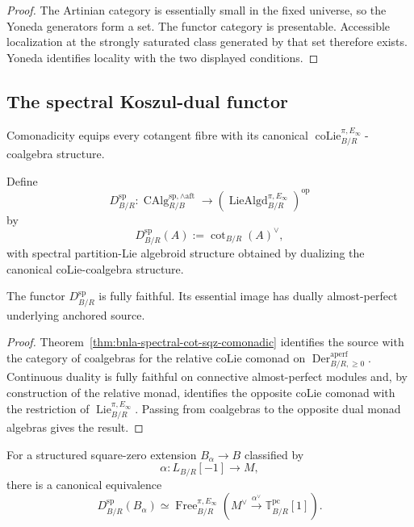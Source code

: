 \begin{proof}
The Artinian category is essentially small in the fixed universe, so the
Yoneda generators form a set.  The functor category is presentable.
Accessible localization at the strongly saturated class generated by that set
therefore exists.  Yoneda identifies locality with the two displayed
conditions.
\end{proof}

\subsection{The spectral Koszul-dual functor}

Comonadicity equips every cotangent fibre with its canonical
$\operatorname{coLie}^{\pi,E_\infty}_{B/R}$-coalgebra structure.

\begin{definition}
\label{def:bnla-spectral-D-functor}
Define
\[
    D^{\mathrm{sp}}_{B/R}:
    \operatorname{CAlg}^{\mathrm{sp},\wedge\mathrm{aft}}_{R/B}
    \longrightarrow
    \left(
        \operatorname{LieAlgd}^{\pi,E_\infty}_{B/R}
    \right)^{\mathrm{op}}
\]
by
\[
\boxed{
    D^{\mathrm{sp}}_{B/R}(A)
    :=
    \operatorname{cot}_{B/R}(A)^\vee,}
\]
with spectral partition-Lie algebroid structure obtained by dualizing the
canonical coLie-coalgebra structure.
\end{definition}

\begin{theorem}
\label{thm:bnla-spectral-D-fully-faithful}
The functor $D^{\mathrm{sp}}_{B/R}$ is fully faithful.  Its essential image has
dually almost-perfect underlying anchored source.
\end{theorem}

\begin{proof}
Theorem~\ref{thm:bnla-spectral-cot-sqz-comonadic} identifies the source with
the category of coalgebras for the relative coLie comonad on
$\operatorname{Der}^{\mathrm{aperf}}_{B/R,\geq0}$.  Continuous duality is fully
faithful on connective almost-perfect modules and, by construction of the
relative monad, identifies the opposite coLie comonad with the restriction of
$\operatorname{Lie}^{\pi,E_\infty}_{B/R}$.  Passing from coalgebras to the
opposite dual monad algebras gives the result.
\end{proof}

\begin{proposition}
\label{prop:bnla-square-zero-free-spectral-algebroid}
For a structured square-zero extension $B_\alpha\to B$ classified by
\[
    \alpha:L_{B/R}[-1]\longrightarrow M,
\]
there is a canonical equivalence
\[
\boxed{
    D^{\mathrm{sp}}_{B/R}(B_\alpha)
    \simeq
    \operatorname{Free}^{\pi,E_\infty}_{B/R}
    \left(
        M^\vee\xrightarrow{\alpha^\vee}
        \mathbb T^{\mathrm{pc}}_{B/R}[1]
    \right).}
\]
\end{proposition}

